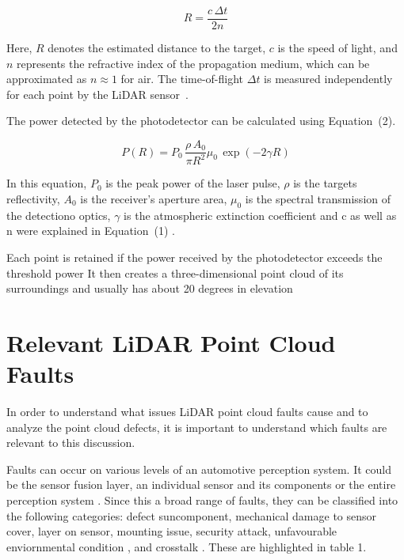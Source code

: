 \begin{equation}
R = \frac{c \, \Delta t}{2n}
\end{equation}

Here, $R$ denotes the estimated distance to the target, $c$ is the speed of light, and $n$ represents the refractive index of the propagation medium, which can be approximated as $n \approx 1$ for air. The time-of-flight $\Delta t$ is measured independently for each point by the LiDAR sensor~\cite{li_lidar_2017}.

The power detected by the photodetector can be calculated using Equation~(2). 

\begin{equation}
\label{2}
P(R) =
P_0 \,
\frac{\rho \, A_0}{\pi R^2} \mu_0
\, \exp\!\left(-2 \gamma R\right)
\end{equation}

In this equation, $P_0$ is the peak power of the laser pulse, $\rho$ is the targets reflectivity, $A_0$ is the receiver's aperture area, $\mu_0$ is the spectral transmission of the detectiono optics, $\gamma$ is the atmospheric extinction coefficient and c as well as n were explained in Equation~(1) \cite{vargas_overview_2021}.

Each point is retained if the power received by the photodetector exceeds the threshold power %
It then creates a three-dimensional point cloud of its surroundings and usually has about 20 degrees in elevation \cite{vargas_overview_2021}


\section{Relevant LiDAR Point Cloud Faults }
In order to understand what issues LiDAR point cloud faults cause and to analyze the point cloud defects, it is important to understand which faults are relevant to this discussion. 

Faults can occur on various levels of an automotive perception system. It could be the sensor fusion layer, an individual sensor and its components or the entire perception system \cite{FDIIR}. 
Since this a broad range of faults, they can be classified into the following categories: defect suncomponent, mechanical damage to sensor cover, layer on sensor, mounting issue, security attack, unfavourable enviornmental condition , and crosstalk \cite{goelles_fault_2020}. These are highlighted in table 1.


